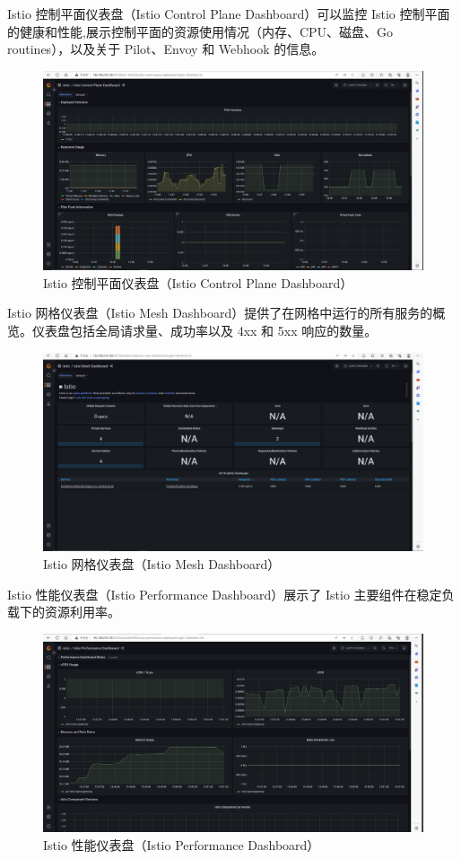Istio 控制平面仪表盘（Istio Control Plane Dashboard）可以监控 Istio 控制平面的健康和性能,展示控制平面的资源使用情况（内存、CPU、磁盘、Go routines），以及关于 Pilot、Envoy 和 Webhook 的信息。
\begin{figure}[H]
	\centering
	\includegraphics[width=1.0\textwidth]{figures/chapter2/CPA.png}
	\caption{Istio 控制平面仪表盘（Istio Control Plane Dashboard）}
	\label{fig:3-Istio 控制平面仪表盘（Istio Control Plane Dashboard）}
\end{figure}
Istio 网格仪表盘（Istio Mesh Dashboard）提供了在网格中运行的所有服务的概览。仪表盘包括全局请求量、成功率以及 4xx 和 5xx 响应的数量。
\begin{figure}[H]
	\centering
	\includegraphics[width=1.0\textwidth]{figures/chapter2/MD.png}
	\caption{Istio 网格仪表盘（Istio Mesh Dashboard）}
	\label{fig:3-Istio 网格仪表盘（Istio Mesh Dashboard）}
\end{figure}
Istio 性能仪表盘（Istio Performance Dashboard）展示了 Istio 主要组件在稳定负载下的资源利用率。
\begin{figure}[H]
	\centering
	\includegraphics[width=1.0\textwidth]{figures/chapter2/PD.png}
	\caption{Istio 性能仪表盘（Istio Performance Dashboard）}
	\label{fig:3-Istio 性能仪表盘（Istio Performance Dashboard）}
\end{figure}
